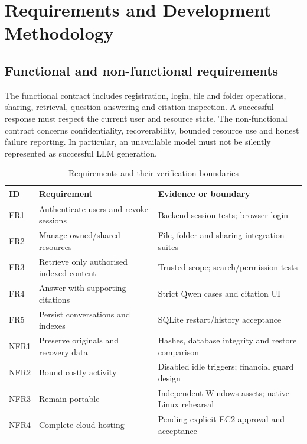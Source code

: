 \chapter{Requirements and Development Methodology}
\section{Functional and non-functional requirements}
The functional contract includes registration, login, file and folder operations, sharing, retrieval, question answering and citation inspection. A successful response must respect the current user and resource state. The non-functional contract concerns confidentiality, recoverability, bounded resource use and honest failure reporting. In particular, an unavailable model must not be silently represented as successful LLM generation.
\par\begin{table}[htbp]\caption{Requirements and their verification boundaries}\small\begin{tabularx}{\linewidth}{lYY}\toprule ID&Requirement&Evidence or boundary\\\midrule
FR1&Authenticate users and revoke sessions&Backend session tests; browser login\\
FR2&Manage owned/shared resources&File, folder and sharing integration suites\\
FR3&Retrieve only authorised indexed content&Trusted scope; search/permission tests\\
FR4&Answer with supporting citations&Strict Qwen cases and citation UI\\
FR5&Persist conversations and indexes&SQLite restart/history acceptance\\
NFR1&Preserve originals and recovery data&Hashes, database integrity and restore comparison\\
NFR2&Bound costly activity&Disabled idle triggers; financial guard design\\
NFR3&Remain portable&Independent Windows assets; native Linux rehearsal\\
NFR4&Complete cloud hosting&Pending explicit EC2 approval and acceptance\\\bottomrule\end{tabularx}\end{table}\par
